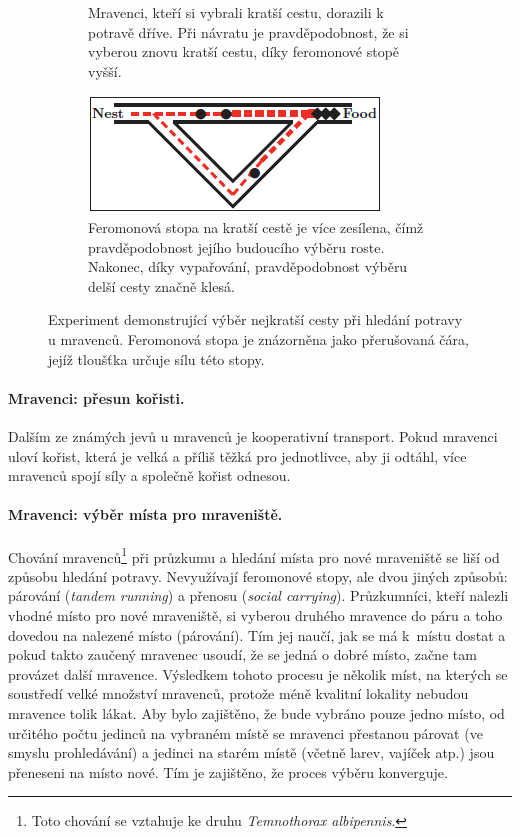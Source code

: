 \documentclass[a4paper,12pt]{article}
\begin{document}
\begin{figure}[here]
\begin{subfigure}[t]{0.45\textwidth}
      \caption{Mravenci, kteří si vybrali kratší cestu, dorazili k potravě dříve. Při návratu je pravděpodobnost,
               že si vyberou znovu kratší cestu, díky feromonové stopě vyšší.}
      \label{fig:aco_c}
    \end{subfigure}\quad%
    \begin{subfigure}[t]{0.45\textwidth}
      \centering
      \includegraphics[width=\textwidth]{img/aco_d}
      \caption{Feromonová stopa na kratší cestě je více zesílena, čímž pravděpodobnost jejího budoucího výběru
               roste. Nakonec, díky vypařování, pravděpodobnost výběru delší cesty značně klesá.}
      \label{fig:aco_d}
    \end{subfigure}
  \caption{Experiment demonstrující výběr nejkratší cesty při hledání potravy u mravenců. Feromonová stopa je
           znázorněna jako přerušovaná čára, jejíž tloušťka určuje sílu této stopy.}
  \label{fig:aco}
\end{figure}

\paragraph{Mravenci: přesun kořisti.}
Dalším ze známých jevů u mravenců je kooperativní transport. Pokud mravenci uloví kořist, která
je velká a příliš těžká pro jednotlivce, aby ji odtáhl, více mravenců spojí síly a společně
kořist odnesou.

\paragraph{Mravenci: výběr místa pro mraveniště.}
Chování mravenců\footnote{Toto chování se vztahuje ke druhu {\it Temnothorax albipennis}.} při
průzkumu a hledání místa pro nové mraveniště se liší od způsobu hledání potravy. Nevyužívají
feromonové stopy, ale dvou jiných způsobů: párování ({\it tandem running}) a přenosu ({\it social
carrying}). Průzkumníci, kteří nalezli vhodné místo pro nové mraveniště, si vyberou druhého
mravence do páru a toho dovedou na nalezené místo (párování). Tím jej naučí, jak se má k~místu
dostat a pokud takto zaučený mravenec usoudí, že se jedná o dobré místo, začne tam provázet
další mravence. Výsledkem tohoto procesu je několik míst, na kterých se soustředí velké množství
mravenců, protože méně kvalitní lokality nebudou mravence tolik lákat. Aby bylo zajištěno,
že bude vybráno pouze jedno místo, od určitého počtu jedinců na vybraném místě se mravenci
přestanou párovat (ve smyslu prohledávání) a jedinci na starém místě (včetně larev, vajíček atp.)
jsou přeneseni na místo nové. Tím je zajištěno, že proces výběru konverguje.
\end{document}
